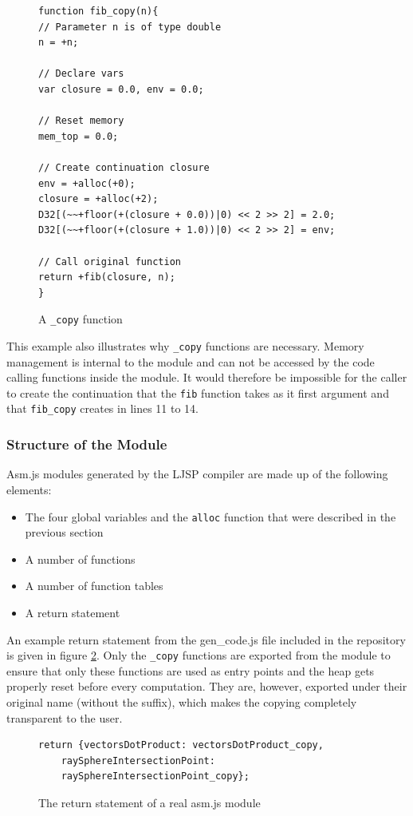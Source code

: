 \documentclass[11pt]{report}
\begin{document}
\begin{figure}[ht]
\begin{lstlisting}
function fib_copy(n){
// Parameter n is of type double
n = +n;

// Declare vars
var closure = 0.0, env = 0.0;

// Reset memory
mem_top = 0.0;

// Create continuation closure
env = +alloc(+0);
closure = +alloc(+2);
D32[(~~+floor(+(closure + 0.0))|0) << 2 >> 2] = 2.0;
D32[(~~+floor(+(closure + 1.0))|0) << 2 >> 2] = env;

// Call original function
return +fib(closure, n);
}
\end{lstlisting}
\caption{A \texttt{_copy} function}
\label{iasmjsmm4}
\end{figure}

This example also illustrates why \texttt{_copy} functions are necessary. Memory management is internal to the module and can not be accessed by the code calling functions inside the module. It would therefore be impossible for the caller to create the continuation that the \texttt{fib} function takes as it first argument and that \texttt{fib_copy} creates in lines 11 to 14.

\subsubsection{Structure of the Module}

Asm.js modules generated by the LJSP compiler are made up of the following elements:
\begin{itemize}
\item The four global variables and the \texttt{alloc} function that were described in the previous section
\item A number of functions
\item A number of function tables
\item A return statement
\end{itemize}

An example return statement from the gen_code.js file included in the repository is given in figure \ref{iasmjsmm5}. Only the \texttt{_copy} functions are exported from the module to ensure that only these functions are used as entry points and the heap gets properly reset before every computation. They are, however, exported under their original name (without the suffix), which makes the copying completely transparent to the user.

\begin{figure}[ht]
\begin{lstlisting}
return {vectorsDotProduct: vectorsDotProduct_copy, 
    raySphereIntersectionPoint: 
    raySphereIntersectionPoint_copy};
\end{lstlisting}
\caption{The return statement of a real asm.js module}
\label{iasmjsmm5}
\end{figure}
\end{document}
